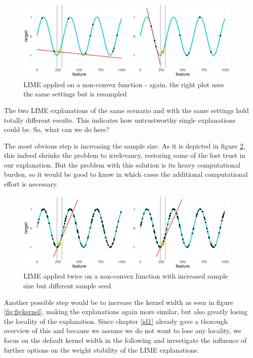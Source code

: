 \documentclass[
]{krantz}
\begin{document}
\begin{figure}

{\centering \includegraphics[width=19.44in]{images/nonconvex_samples_1vs2} 

}

\caption{LIME applied on a non-convex function - again, the right plot uses the same settings but is resampled}\label{fig:figbad}
\end{figure}

The two LIME explanations of the same scenario and with the same settings hold totally different results.
This indicates how untrustworthy single explanations could be.
So, what can we do here?

The most obvious step is increasing the sample size.
As it is depicted in figure \ref{fig:figgood}, this indeed shrinks the problem to irrelevancy, restoring some of the lost trust in our explanation.
But the problem with this solution is its heavy computational burden, so it would be good to know in which cases the additional computational effort is necessary.

\begin{figure}

{\centering \includegraphics[width=19.44in]{images/nonconvex_samples_size100_1vs2} 

}

\caption{LIME applied twice on a non-convex function with increased sample size but different sample seed}\label{fig:figgood}
\end{figure}

Another possible step would be to increase the kernel width as seen in figure \ref{fig:figkernel}, making the explanations again more similar, but also greatly losing the locality of the explanation.
Since chapter \ref{id1} already gave a thorough overview of this and because we assume we do not want to lose any locality, we focus on the default kernel width in the following and investigate the influence of further options on the weight stability of the LIME explanations.
\end{document}
